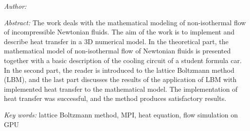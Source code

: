 \bigskip{}

\noindent \emph{Author:} \autor

\bigskip{}

\noindent \emph{Abstract:} The work deals with the mathematical modeling of non-isothermal flow of incompressible Newtonian fluids. The aim of the work is to implement and describe heat transfer in a 3D numerical model. In the theoretical part, the mathematical model of non-isothermal flow of Newtonian fluids is presented together with a basic description of the cooling circuit of a student formula car. In the second part, the reader is introduced to the lattice Boltzmann method (LBM), and the last part discusses the results of the application of LBM with implemented heat transfer to the mathematical model. The implementation of heat transfer was successful, and the method produces satisfactory results.

\bigskip{}

\noindent \emph{Key words:} lattice Boltzmann method, MPI, heat equation, flow simulation on GPU